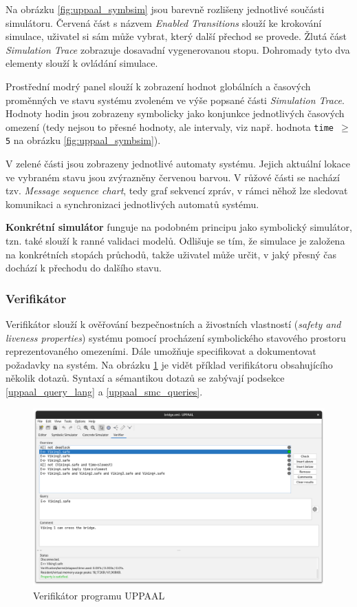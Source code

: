 Na obrázku \ref{fig:uppaal_symbsim} jsou barevně rozlišeny jednotlivé součásti simulátoru. Červená část s názvem \textit{Enabled Transitions} slouží ke krokování simulace, uživatel si sám může vybrat, který další přechod se provede. Žlutá část \textit{Simulation Trace} zobrazuje dosavadní vygenerovanou stopu. Dohromady tyto dva elementy slouží k ovládání simulace.

Prostřední modrý panel slouží k zobrazení hodnot globálních a časových proměnných ve stavu systému zvoleném ve výše popsané části \textit{Simulation Trace}. Hodnoty hodin jsou zobrazeny symbolicky jako konjunkce jednotlivých časových omezení (tedy nejsou to přesné hodnoty, ale intervaly, viz např. hodnota \texttt{time $\geq$ 5} na obrázku \ref{fig:uppaal_symbsim}).

V zelené části jsou zobrazeny jednotlivé automaty systému. Jejich aktuální lokace ve vybraném stavu jsou zvýrazněny červenou barvou. V růžové části se nachází tzv. \textit{Message sequence chart}, tedy graf sekvencí zpráv, v rámci něhož lze sledovat komunikaci a synchronizaci jednotlivých automatů systému.

\bigskip

\textbf{Konkrétní simulátor} funguje na podobném principu jako symbolický simulátor, tzn. také slouží k ranné validaci modelů. Odlišuje se tím, že simulace je založena na konkrétních stopách průchodů, takže uživatel může určit, v jaký přesný čas dochází k přechodu do dalšího stavu.

\subsubsection{Verifikátor}
Verifikátor slouží k ověřování bezpečnostních a živostních vlastností (\textit{safety and liveness properties}) systému pomocí procházení symbolického stavového prostoru reprezentovaného omezeními. Dále umožňuje specifikovat a dokumentovat požadavky na systém. Na obrázku \ref{fig:uppaal_verifier} je vidět příklad verifikátoru obsahujícího několik dotazů. Syntaxí a sémantikou dotazů se zabývají podsekce \ref{uppaal_query_lang} a \ref{uppaal_smc_queries}.

\begin{figure}[H]
    \centering
    \includegraphics[width=\textwidth]{obrazky-figures/uppaal_verifier.png}
    \caption{Verifikátor programu UPPAAL}
    \label{fig:uppaal_verifier}
\end{figure}

